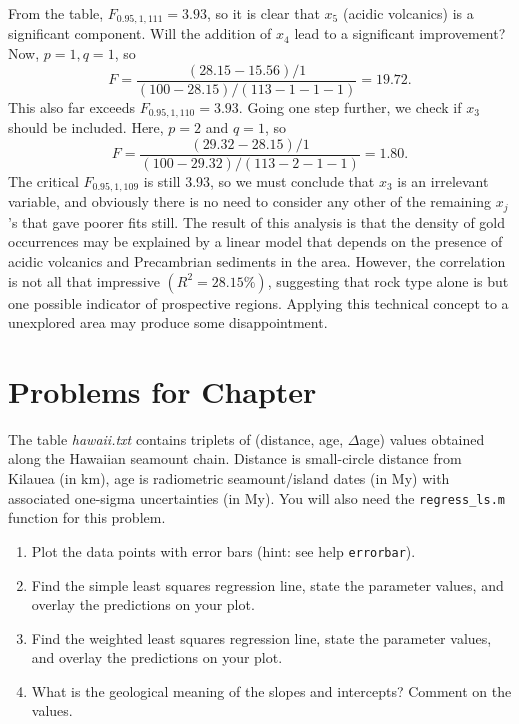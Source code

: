 \begin{example}
From the table, $F_{0.95,1,111} = 3.93$, so it is clear that $x_5$ (acidic volcanics) is a significant component.  Will the 
addition of $x_4$ lead to a significant improvement?  Now, $p = 1, q = 1$, so 
\begin{equation}
F = \frac{(28.15 - 15.56)/1}{(100 - 28.15)/(113 - 1 -1 -1 )} = 19.72.
\end{equation}
This also far exceeds $F_{0.95,1,110} = 3.93$.  Going one step further, we check if $x_3$ should be 
included.  Here, $p = 2$ and $q = 1$, so
\begin{equation}
F = \frac{(29.32 - 28.15)/1}{(100 - 29.32)/(113 - 2 - 1 -1 )} = 1.80.
\end{equation}	 
The critical $F_{0.95,1,109}$ is still 3.93, so we must conclude that $x_3$ is an irrelevant variable, and 
obviously there is no need to consider any other of the remaining $x_j$'s that gave poorer fits still.  The result of this analysis 
is that the density of gold occurrences may be explained by a linear model that depends on the 
presence of acidic volcanics and Precambrian sediments in the area.  
However, the correlation is not all that impressive $(R^2 = 28.15\%)$, suggesting that rock type 
alone is but one possible indicator of prospective regions.  Applying this technical concept to a
unexplored area may produce some disappointment.
\end{example}

\clearpage
\section{Problems for Chapter \thechapter}

\begin{problem}
The table \emph{hawaii.txt} contains triplets of (distance, age, $\Delta$age) values
obtained along the Hawaiian seamount chain.  Distance is small-circle distance from Kilauea (in km),
age is radiometric seamount/island dates (in My) with associated one-sigma uncertainties (in My).
You will also need the \texttt{regress\_ls.m} function for this problem.
\begin{enumerate}[label=\alph*)]
\item  Plot the data points with error bars (hint: see help \texttt{errorbar}).
\item  Find the simple least squares regression line, state the parameter values, and overlay the predictions on your plot.
\item  Find the weighted least squares regression line, state the parameter values, and overlay the predictions on your plot.
\item What is the geological meaning of the slopes and intercepts?  Comment on the values.
\end{enumerate}
\end{problem}

